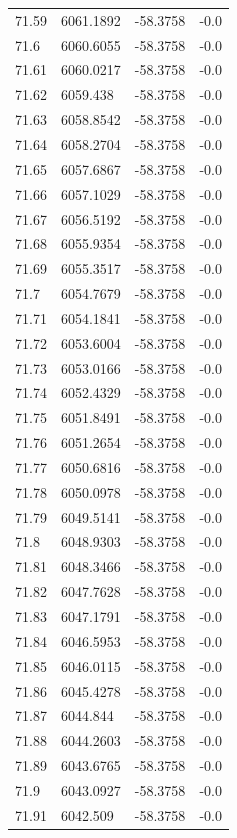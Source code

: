 \begin{table}[H]
\begin{tabular}{llll}
71.59 & 6061.1892 & -58.3758 & -0.0 \\
71.6 & 6060.6055 & -58.3758 & -0.0 \\
71.61 & 6060.0217 & -58.3758 & -0.0 \\
71.62 & 6059.438 & -58.3758 & -0.0 \\
71.63 & 6058.8542 & -58.3758 & -0.0 \\
71.64 & 6058.2704 & -58.3758 & -0.0 \\
71.65 & 6057.6867 & -58.3758 & -0.0 \\
71.66 & 6057.1029 & -58.3758 & -0.0 \\
71.67 & 6056.5192 & -58.3758 & -0.0 \\
71.68 & 6055.9354 & -58.3758 & -0.0 \\
71.69 & 6055.3517 & -58.3758 & -0.0 \\
71.7 & 6054.7679 & -58.3758 & -0.0 \\
71.71 & 6054.1841 & -58.3758 & -0.0 \\
71.72 & 6053.6004 & -58.3758 & -0.0 \\
71.73 & 6053.0166 & -58.3758 & -0.0 \\
71.74 & 6052.4329 & -58.3758 & -0.0 \\
71.75 & 6051.8491 & -58.3758 & -0.0 \\
71.76 & 6051.2654 & -58.3758 & -0.0 \\
71.77 & 6050.6816 & -58.3758 & -0.0 \\
71.78 & 6050.0978 & -58.3758 & -0.0 \\
71.79 & 6049.5141 & -58.3758 & -0.0 \\
71.8 & 6048.9303 & -58.3758 & -0.0 \\
71.81 & 6048.3466 & -58.3758 & -0.0 \\
71.82 & 6047.7628 & -58.3758 & -0.0 \\
71.83 & 6047.1791 & -58.3758 & -0.0 \\
71.84 & 6046.5953 & -58.3758 & -0.0 \\
71.85 & 6046.0115 & -58.3758 & -0.0 \\
71.86 & 6045.4278 & -58.3758 & -0.0 \\
71.87 & 6044.844 & -58.3758 & -0.0 \\
71.88 & 6044.2603 & -58.3758 & -0.0 \\
71.89 & 6043.6765 & -58.3758 & -0.0 \\
71.9 & 6043.0927 & -58.3758 & -0.0 \\
71.91 & 6042.509 & -58.3758 & -0.0 \\

\end{tabular}
\end{table}
